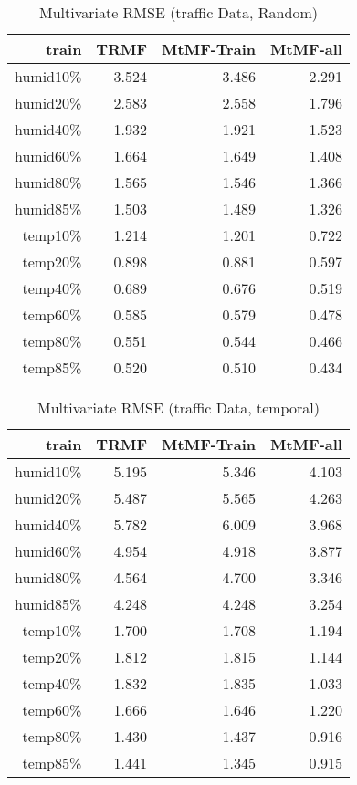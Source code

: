 \begin{table}[htbp]
\setlength{\tabcolsep}{2pt}
\centering
\caption{Multivariate RMSE (traffic Data, Random)}
\label{table_multi_traffic_random}
\begin{tabular}{r | r r r}
train	&TRMF	&MtMF-Train	&MtMF-all \\ \hline
humid10\%	&3.524 	&3.486 	&2.291\\  
humid20\%	&2.583 	&2.558 	&1.796\\
humid40\%	&1.932 	&1.921 	&1.523\\
humid60\%	&1.664 	&1.649 	&1.408\\
humid80\%	&1.565 	&1.546 	&1.366\\
humid85\%	&1.503 	&1.489 	&1.326\\ \hline
 temp10\%	&1.214 	&1.201 	&0.722\\
 temp20\%	&0.898 	&0.881 	&0.597\\
 temp40\%	&0.689 	&0.676 	&0.519\\
 temp60\%	&0.585 	&0.579 	&0.478\\
 temp80\%	&0.551 	&0.544 	&0.466\\
 temp85\%	&0.520 	&0.510 	&0.434\\
\end{tabular}
\end{table}

\begin{table}[htbp]
\setlength{\tabcolsep}{2pt}
\centering
\caption{Multivariate RMSE (traffic Data, temporal)}
\label{table_multi_traffic_temporal}
\begin{tabular}{r | r r r}
train	&TRMF	&MtMF-Train	&MtMF-all \\ \hline
humid10\%	&5.195 	&5.346 	&4.103\\  
humid20\%	&5.487 	&5.565 	&4.263\\
humid40\%	&5.782 	&6.009 	&3.968\\
humid60\%	&4.954 	&4.918 	&3.877\\
humid80\%	&4.564 	&4.700 	&3.346\\
humid85\%	&4.248 	&4.248 	&3.254\\ \hline
 temp10\%	&1.700 	&1.708 	&1.194\\
 temp20\%	&1.812 	&1.815 	&1.144\\
 temp40\%	&1.832 	&1.835 	&1.033\\
 temp60\%	&1.666 	&1.646 	&1.220\\
 temp80\%	&1.430 	&1.437 	&0.916\\
 temp85\%	&1.441 	&1.345 	&0.915\\
\end{tabular}
\end{table}

